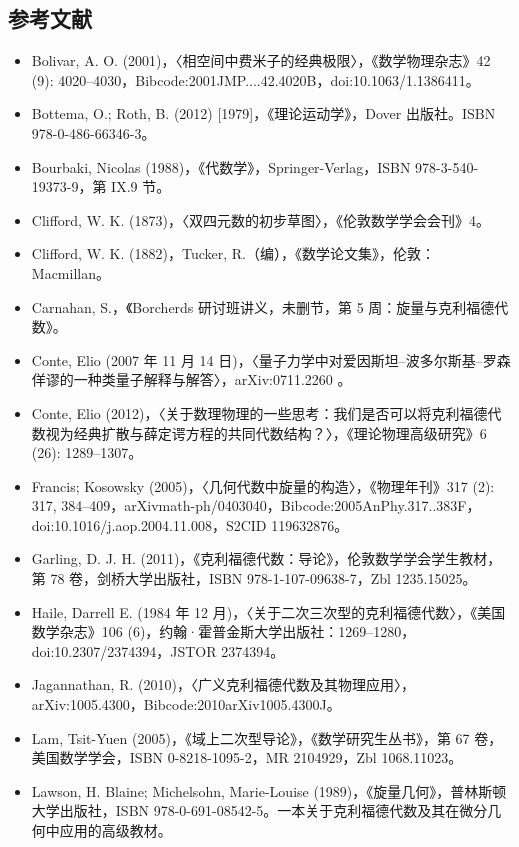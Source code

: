 \subsection{参考文献}
\begin{itemize}
\item Bolivar, A. O. (2001)，〈相空间中费米子的经典极限〉，《数学物理杂志》42 (9): 4020–4030，Bibcode:2001JMP....42.4020B，doi:10.1063/1.1386411。
\item Bottema, O.; Roth, B. (2012) [1979]，《理论运动学》，Dover 出版社。ISBN 978-0-486-66346-3。
\item Bourbaki, Nicolas (1988)，《代数学》，Springer-Verlag，ISBN 978-3-540-19373-9，第 IX.9 节。
\item Clifford, W. K. (1873)，〈双四元数的初步草图〉，《伦敦数学学会会刊》4。
\item Clifford, W. K. (1882)，Tucker, R.（编），《数学论文集》，伦敦：Macmillan。
\item Carnahan, S.，《Borcherds 研讨班讲义，未删节，第 5 周：旋量与克利福德代数》。
\item Conte, Elio (2007 年 11 月 14 日)，〈量子力学中对爱因斯坦–波多尔斯基–罗森佯谬的一种类量子解释与解答〉，arXiv:0711.2260 。
\item Conte, Elio (2012)，〈关于数理物理的一些思考：我们是否可以将克利福德代数视为经典扩散与薛定谔方程的共同代数结构？〉，《理论物理高级研究》6 (26): 1289–1307。
\item Francis; Kosowsky (2005)，〈几何代数中旋量的构造〉，《物理年刊》317 (2): 317, 384–409，arXiv\:math-ph/0403040，Bibcode:2005AnPhy.317..383F，doi:10.1016/j.aop.2004.11.008，S2CID 119632876。
\item Garling, D. J. H. (2011)，《克利福德代数：导论》，伦敦数学学会学生教材，第 78 卷，剑桥大学出版社，ISBN 978-1-107-09638-7，Zbl 1235.15025。
\item Haile, Darrell E. (1984 年 12 月)，〈关于二次三次型的克利福德代数〉，《美国数学杂志》106 (6)，约翰·霍普金斯大学出版社：1269–1280，doi:10.2307/2374394，JSTOR 2374394。
\item Jagannathan, R. (2010)，〈广义克利福德代数及其物理应用〉，arXiv:1005.4300，Bibcode:2010arXiv1005.4300J。
\item Lam, Tsit-Yuen (2005)，《域上二次型导论》，《数学研究生丛书》，第 67 卷，美国数学学会，ISBN 0-8218-1095-2，MR 2104929，Zbl 1068.11023。
\item Lawson, H. Blaine; Michelsohn, Marie-Louise (1989)，《旋量几何》，普林斯顿大学出版社，ISBN 978-0-691-08542-5。一本关于克利福德代数及其在微分几何中应用的高级教材。

\end{itemize}
